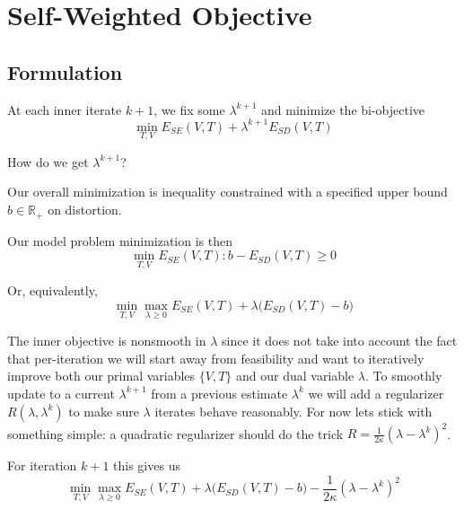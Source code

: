 
\section{Self-Weighted Objective}
\label{sec:self_weighting}
\subsection{Formulation}
At each inner iterate $k+1$, we fix some $\lambda^{k+1}$ and minimize the bi-objective 
\[ \min_{T,V} E_{SE}(V,T) + \lambda^{k+1} E_{SD}(V,T) \]

How do we get $\lambda^{k+1}$? 

Our overall minimization is inequality constrained with a specified upper bound $b \in \mathbb{R}_+$ on distortion. 

Our model problem minimization is then 
\[ \min_{T,V} E_{SE}(V,T) :  b - E_{SD}(V,T) \geq 0 \]

Or, equivalently,
\[ \min_{T,V} \max_{\lambda \geq 0} E_{SE}(V,T) + \lambda \big( E_{SD}(V,T) - b\big) \]

The inner objective is nonsmooth in $\lambda$ since it does not take into account %
the fact that per-iteration we will start away from feasibility and want to iteratively improve both our primal variables $\{V,T\}$ and our dual variable $\lambda$.  To smoothly update to a current $\lambda^{k+1}$ from a previous estimate $\lambda^k$ we will add a regularizer $R(\lambda,\lambda^k)$ to make sure $\lambda$ iterates behave reasonably. For now lets stick with something simple:  a quadratic regularizer should do the trick  $R =\frac{1}{2\kappa} (\lambda- \lambda^k)^2$.  

For iteration $k+1$ this gives us 
\[ \min_{T,V} \max_{\lambda \geq 0} E_{SE}(V,T) + \lambda \big( E_{SD}(V,T) - b\big) - \frac{1}{2\kappa} (\lambda- \lambda^k)^2 \]


